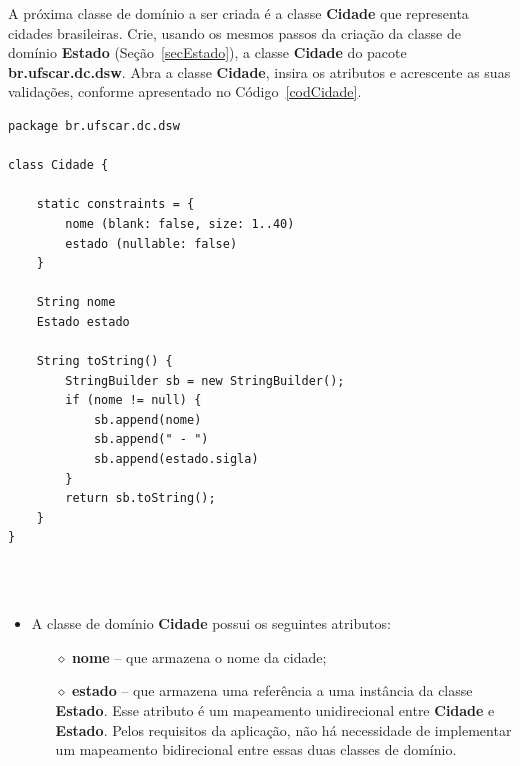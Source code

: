 \vspace{0.5cm}

A próxima classe de domínio a ser  criada é a classe {\bf Cidade} que representa
cidades  brasileiras.  Crie, usando  os mesmos  passos da  criação da  classe de
domínio {\bf  Estado} (Seção~\ref{secEstado}), a  classe {\bf Cidade}  do pacote
{\bf  br.ufscar.dc.dsw}. Abra  a  classe  {\bf Cidade},  insira  os atributos  e
acrescente as suas validações, conforme apresentado no Código~\ref{codCidade}.  

\begin{lstlisting}[caption=Classe  de  domínio   {\bf  Cidade},  frame  =  trBL,
    float=htbp, label=codCidade] 
package br.ufscar.dc.dsw

class Cidade {

    static constraints = {
        nome (blank: false, size: 1..40)
        estado (nullable: false)
    }

    String nome
    Estado estado
    
    String toString() {
        StringBuilder sb = new StringBuilder();
        if (nome != null) {
            sb.append(nome)
            sb.append(" - ")
            sb.append(estado.sigla)
        }
        return sb.toString();
    }
}
\end{lstlisting}

\hspace{1cm}\\
\hspace{1cm}\\

\begin{itemize}

\item A classe de domínio {\bf Cidade} possui os seguintes atributos:

\vspace{0.2cm}

\begin{itemize}

\item[$\diamond$] {\bf nome} -- que armazena o nome da cidade;

\vspace{0.2cm}

\item[$\diamond$] {\bf estado} -- que armazena uma referência a uma instância da
  classe {\bf Estado}.   Esse atributo é um mapeamento  unidirecional entre {\bf
    Cidade} e {\bf  Estado}.  Pelos requisitos da aplicação,  não há necessidade
  de implementar um mapeamento bidirecional entre essas duas classes de domínio.

\end{itemize}

\end{itemize}

